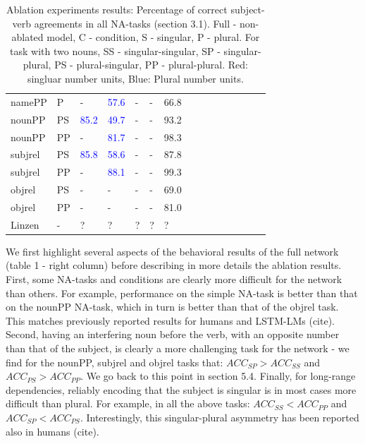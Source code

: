 \begin{center}
\begin{table}[ht]
\begin{tabular}{|P{1.4cm}|P{0.4cm}||P{0.6cm}|P{0.6cm}|P{0.6cm}|P{0.6cm}|P{0.6cm}|P{0.6cm}|P{0.6cm}|P{0.6cm}|P{0.6cm}|P{0.6cm}|P{0.6cm}|P{0.6cm}||P{0.6cm}|}
\B namePP & \B P & - &  \textcolor{blue}{57.6} &  - &  - &  66.8 \\

\B nounPP & \B PS &  \textcolor{blue}{85.2} &  \textcolor{blue}{49.7} & - &  - &  93.2 \\

\B nounPP & \B PP &  - &  \textcolor{blue}{81.7} &  - &  - &  98.3 \\

\B subjrel & \B PS &  \textcolor{blue}{85.8}  &  \textcolor{blue}{58.6}  &  - &  - &  87.8 \\

\B subjrel & \B PP &  - &  \textcolor{blue}{88.1} &  - &  - &  99.3 \\

\B objrel & \B PS & - &  - &  - &  - &  69.0 \\

\B objrel & \B PP &  - &  - &  - &  - &  81.0 \\
\hline
\hline
\B Linzen & \B - &  ? &  ? &  ? &  ? &  ? \\
\hline
\end{tabular}
\caption{Ablation experiments results: Percentage of correct subject-verb agreements in all NA-tasks (section 3.1). Full - non-ablated model, C - condition, S - singular, P - plural. For task with two nouns, SS - singular-singular, SP - singular-plural, PS - plural-singular, PP - plural-plural. Red: singluar number units, Blue: Plural number units.}
\end{table}
\end{center}

We first highlight several aspects of the behavioral results of the full network (table 1 - right column) before describing in more details the ablation results. First, some NA-tasks and conditions are clearly more difficult for the network than others. For example, performance on the simple NA-task is better than that on the nounPP NA-task, which in turn is better than that of the objrel task. This matches previously reported results for humans and LSTM-LMs (cite). Second, having an interfering noun before the verb, with an opposite number than that of the subject, is clearly a more challenging task for the network - we find for the nounPP, subjrel and objrel tasks that: $ACC_{SP}>ACC_{SS}$ and $ACC_{PS}>ACC_{PP}$. We go back to this point in section 5.4. Finally, for long-range dependencies, reliably encoding that the subject is singular is in most cases more difficult than plural. For example, in all the above tasks: $ACC_{SS}<ACC_{PP}$ and $ACC_{SP}<ACC_{PS}$. Interestingly, this singular-plural asymmetry has been reported also in humans (cite). 

